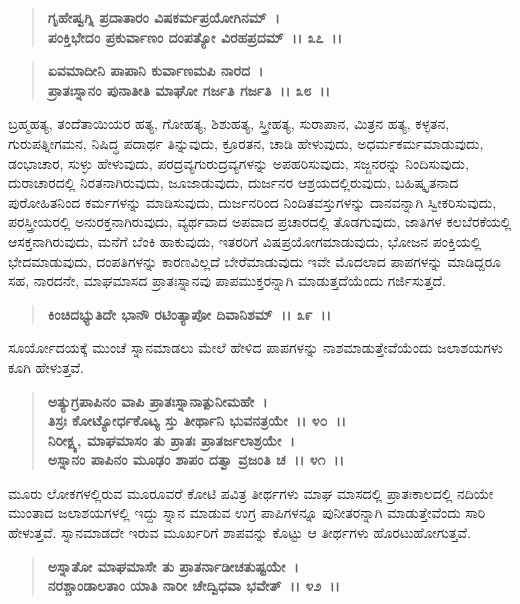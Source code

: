 \begin{verse}
\textbf{ಗೃಹೇಷ್ವಗ್ನಿ ಪ್ರದಾತಾರಂ ವಿಷಕರ್ಮಪ್ರಯೋಗಿನಮ್~।}\\\textbf{ಪಂಕ್ತಿಭೇದಂ ಪ್ರಕುರ್ವಾಣಂ ದಂಪತ್ಯೋ ವಿರಹಪ್ರದಮ್~।। ೩೭~।।}
\end{verse}

\begin{verse}
\textbf{ಏವಮಾದೀನಿ ಪಾಪಾನಿ ಕುರ್ವಾಣಮಪಿ ನಾರದ~।}\\\textbf{ಪ್ರಾತಃಸ್ನಾನಂ ಪುನಾತೀತಿ ಮಾಘೋ ಗರ್ಜತಿ ಗರ್ಜತಿ~।। ೩೮~।।}
\end{verse}

ಬ್ರಹ್ಮಹತ್ಯ, ತಂದೆತಾಯಿಯರ ಹತ್ಯ, ಗೋಹತ್ಯ, ಶಿಶುಹತ್ಯ, ಸ್ತ್ರೀಹತ್ಯ, ಸುರಾಪಾನ, ಮಿತ್ರನ ಹತ್ಯ, ಕಳ್ಳತನ, ಗುರುಪತ್ನೀಗಮನ, ನಿಷಿದ್ಧ ಪದಾರ್ಥ ತಿನ್ನುವುದು, ಕ್ರೂರತನ, ಚಾಡಿ ಹೇಳುವುದು, ಅಧರ್ಮಕರ್ಮಮಾಡುವುದು, ಡಂಭಾಚಾರ, ಸುಳ್ಳು ಹೇಳುವುದು, ಪರದ್ರವ್ಯಗುರುದ್ರವ್ಯಗಳನ್ನು ಅಪಹರಿಸುವುದು, ಸಜ್ಜನರನ್ನು ನಿಂದಿಸುವುದು, ದುರಾಚಾರದಲ್ಲಿ ನಿರತನಾಗಿರುವುದು, ಜೂಜಾಡುವುದು, ದುರ್ಜನರ ಆಶ್ರಯದಲ್ಲಿರುವುದು, ಬಹಿಷ್ಕೃತನಾದ ಪುರೋಹಿತನಿಂದ ಕರ್ಮಗಳನ್ನು ಮಾಡಿಸುವುದು, ದುರ್ಜನರಿಂದ ನಿಂದಿತವಸ್ತುಗಳನ್ನು ದಾನವನ್ನಾಗಿ ಸ್ವೀಕರಿಸುವುದು, ಪರಸ್ತ್ರೀಯರಲ್ಲಿ ಅನುರಕ್ತನಾಗಿರುವುದು, ವ್ಯರ್ಥವಾದ ಅಪವಾದ ಪ್ರಚಾರದಲ್ಲಿ ತೊಡಗುವುದು, ಜಾತಿಗಳ ಕಲಬೆರಕೆಯಲ್ಲಿ ಆಸಕ್ತನಾಗಿರುವುದು, ಮನೆಗೆ ಬೆಂಕಿ ಹಾಕುವುದು, ಇತರರಿಗೆ ವಿಷಪ್ರಯೋಗಮಾಡುವುದು, ಭೋಜನ ಪಂಕ್ತಿಯಲ್ಲಿ ಭೇದಮಾಡುವುದು, ದಂಪತಿಗಳನ್ನು ಕಾರಣವಿಲ್ಲದೆ ಬೇರೆಮಾಡುವುದು ಇವೇ ಮೊದಲಾದ ಪಾಪಗಳನ್ನು ಮಾಡಿದ್ದರೂ ಸಹ, ನಾರದನೇ, ಮಾಘಮಾಸದ ಪ್ರಾತಃಸ್ನಾನವು ಪಾಪಮುಕ್ತರನ್ನಾಗಿ ಮಾಡುತ್ತದೆಯೆಂದು ಗರ್ಜಿಸುತ್ತದೆ.

\begin{verse}
\textbf{ಕಿಂಚಿದಭ್ಯುತಿದೇ ಭಾನೌ ರಟಿಂತ್ಯಾಪೋ ದಿವಾನಿಶಮ್~।। ೩೯~।।}
\end{verse}

ಸೂರ್ಯೋದಯಕ್ಕೆ ಮುಂಚೆ ಸ್ನಾನಮಾಡಲು ಮೇಲೆ ಹೇಳಿದ ಪಾಪಗಳನ್ನು ನಾಶಮಾಡುತ್ತೇವೆಯೆಂದು ಜಲಾಶಯಗಳು ಕೂಗಿ ಹೇಳುತ್ತವೆ.

\begin{verse}
\textbf{ಅತ್ಯುಗ್ರಪಾಪಿನಂ ವಾಪಿ ಪ್ರಾತಃಸ್ನಾನಾತ್ಪುನೀಮಹೇ~।}\\\textbf{ತಿಸ್ರಃ ಕೋಟ್ಯೋರ್ಧಕೊಟ್ಯ ಸ್ತು ತೀರ್ಥಾನಿ ಭುವನತ್ರಯೇ~।। ೪೦~।।}\\\textbf{ನಿರೀಕ್ಷ್ಯ, ಮಾಘಮಾಸಂ ತು ಪ್ರಾತಃ ಪ್ರಾತರ್ಜಲಾಶ್ರಯೇ~।}\\\textbf{ಅಸ್ನಾನಂ ಪಾಪಿನಂ ಮೂಢಂ ಶಾಪಂ ದತ್ವಾ ವ್ರಜಂತಿ ಚ~।। ೪೧~।।}
\end{verse}

ಮೂರು ಲೋಕಗಳಲ್ಲಿರುವ ಮೂರೂವರೆ ಕೋಟಿ ಪವಿತ್ರ ತೀರ್ಥಗಳು ಮಾಘ ಮಾಸದಲ್ಲಿ ಪ್ರಾತಃಕಾಲದಲ್ಲಿ ನದಿಯೇ ಮುಂತಾದ ಜಲಾಶಯಗಳಲ್ಲಿ ಇದ್ದು ಸ್ನಾನ ಮಾಡುವ ಉಗ್ರ ಪಾಪಿಗಳನ್ನೂ ಪುನೀತರನ್ನಾಗಿ ಮಾಡುತ್ತೇವೆಂದು ಸಾರಿ ಹೇಳುತ್ತವೆ. ಸ್ನಾನಮಾಡದೇ ಇರುವ ಮೂರ್ಖರಿಗೆ ಶಾಪವನ್ನು ಕೊಟ್ಟು ಆ ತೀರ್ಥಗಳು ಹೊರಟುಹೋಗುತ್ತವೆ.

\begin{verse}
\textbf{ಅಸ್ನಾತೋ ಮಾಘಮಾಸೇ ತು ಪ್ರಾತರ್ನಾಡೀಚತುಷ್ಟಯೇ~।}\\\textbf{ನರಶ್ಚಾಂಡಾಲತಾಂ ಯಾತಿ ನಾರೀ ಚೇದ್ವಿಧವಾ ಭವೇತ್~।। ೪೨~।।}
\end{verse}

